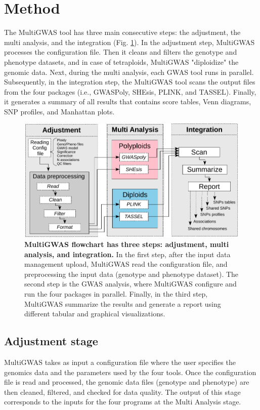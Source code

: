 \documentclass{article}
\begin{document}
\section{Method}

The MultiGWAS tool has three main consecutive steps: the adjustment, the multi analysis, and the integration (Fig. \ref{fig: Pipeline}). In the adjustment step, MultiGWAS processes the configuration file. Then it cleans and filters the genotype and phenotype datasets, and in case of tetraploids,  MultiGWAS "diploidize" the genomic data. Next, during the multi analysis, each GWAS tool runs in parallel. Subsequently, in the integration step, the MultiGWAS tool scans the output files from the four packages (i.e., GWASPoly, SHEsis, PLINK, and TASSEL). Finally, it generates a summary of all results that contains score tables, Venn diagrams, SNP profiles, and Manhattan plots. 
\begin{figure}
\centering{}\includegraphics[width=12cm]{images/paper-multiGWAS-flowchart-stages} \caption{\textbf{MultiGWAS flowchart has three steps: adjustment, multi analysis, and integration.} In the first step, after the input data management upload, MultiGWAS read the configuration file, and preprocessing the input data (genotype and phenotype dataset). The second step is the GWAS analysis, where MultiGWAS configure and run the four packages in parallel. Finally, in the third step, MultiGWAS summarize the results and generate a report using different tabular and graphical visualizations.\label{fig: Pipeline}}
\end{figure}

\subsection{Adjustment stage}

MultiGWAS takes as input a configuration file where the user specifies the genomics data and the parameters used by the four tools. Once the configuration file is read and processed, the genomic data files (genotype and phenotype) are then cleaned, filtered, and checked for data quality. The output of this stage corresponds to the inputs for the four programs at the Multi Analysis stage.
\end{document}
